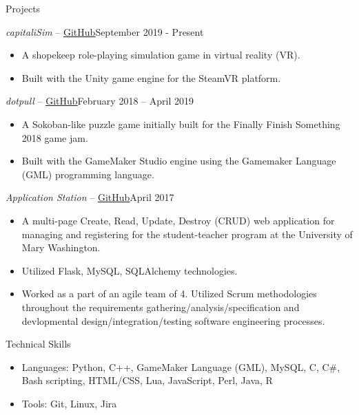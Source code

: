\documentclass[calibri]{mcdowellcv}
\begin{document}
	\begin{cvsection}{Projects}
		\begin{cvsubsection}{\textit{capitaliSim} -- \href{https://github.com/acarlyle/shopvr}{\underline{GitHub}}}{September 2019 - Present}	
			\begin{itemize}
				\item A shopekeep role-playing simulation game in virtual reality (VR).
				\item Built with the Unity game engine for the SteamVR platform.  
			\end{itemize}
		\end{cvsubsection}
		
		\begin{cvsubsection}{\textit{dotpull} -- \href{https://github.com/acarlyle/dotpull}{\underline{GitHub}}}{February 2018 -- April 2019}	
			\begin{itemize}
				\item A Sokoban-like puzzle game initially built for the Finally Finish Something 2018 game jam.  
				\item Built with the GameMaker Studio engine using the Gamemaker Language (GML) programming language.  
			\end{itemize}
		\end{cvsubsection}
		
		\begin{cvsubsection}{\textit{Application Station} -- \href{https://github.com/acarlyle/InformationStation}{\underline{GitHub}}}{April 2017}		
			\begin{itemize}
				\item A multi-page Create, Read, Update, Destroy (CRUD) web application for managing and registering for the student-teacher program at the University of Mary Washington.  
				\item Utilized Flask, MySQL, SQLAlchemy technologies.
				\item Worked as a part of an agile team of 4.  Utilized Scrum methodologies throughout the requirements gathering/analysis/specification and devlopmental design/integration/testing software engineering processes.
			\end{itemize}
		\end{cvsubsection}
	\end{cvsection}
	
	\begin{cvsection}{Technical Skills}
		\begin{cvsubsection}{}{}{}	
			\begin{itemize}
				\item Languages: Python, C++, GameMaker Language (GML), MySQL, C, C\#, Bash scripting, HTML/CSS, Lua, JavaScript, Perl, Java, R 
				\item Tools: Git, Linux, Jira
			\end{itemize}
		\end{cvsubsection}
	\end{cvsection}
	
\end{document}
